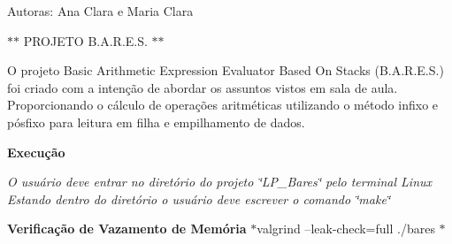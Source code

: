 Autoras\+: Ana Clara e Maria Clara

$\ast$$\ast$ P\+R\+O\+J\+E\+T\+O B.\+A.\+R.\+E.\+S. $\ast$$\ast$

O projeto Basic Arithmetic Expression Evaluator Based On Stacks (B.\+A.\+R.\+E.\+S.) foi criado com a intenção de abordar os assuntos vistos em sala de aula. Proporcionando o cálculo de operações aritméticas utilizando o método infixo e pósfixo para leitura em filha e empilhamento de dados.

{\bfseries Execução}

{\itshape O usuário deve entrar no diretório do projeto \char`\"{}\+L\+P\+\_\+\+Bares\char`\"{} pelo terminal Linux} {\itshape Estando dentro do diretório o usuário deve escrever o comando \char`\"{}make\char`\"{}}

{\bfseries Verificação de Vazamento de Memória} $\ast$valgrind --leak-\/check=full ./bares $\ast$ 